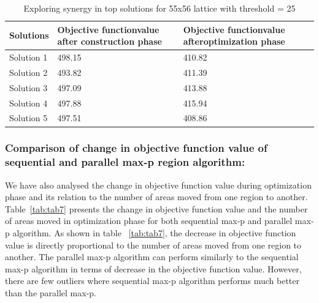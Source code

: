 \documentclass[conference]{IEEEtran}
\begin{document}
\begin{table}[!htbp]
\begin{center}
\begin{tabular}{|C{1.4cm}|C{1.4cm}|C{1.4cm}|}
\hline
Solutions & Objective function\newline value after \newline construction phase & Objective function\newline value after\newline optimization phase\\
\hline
Solution 1 & 498.15 & 410.82\\
\hline
Solution 2 & 493.82 & 411.39\\
\hline
Solution 3 & 497.09 & 413.88\\
\hline
Solution 4 & 497.88 & 415.94\\
\hline
Solution 5 & 497.51 & 408.86\\
\hline
\end{tabular}
\caption{Exploring synergy in top solutions for 55x56 lattice with threshold = 25}
\label{tab:tab10}
\end{center}
\end{table}

\subsubsection*{Comparison of change in objective function value of sequential and parallel max-p region algorithm:}
We have also analysed the change in objective function value during optimization
phase and its relation to the number of areas moved from one region to another.
Table~\ref{tab:tab7} presents the change in objective function value and the number
of areas moved in optimization phase for both sequential max-p and parallel
max-p algorithm. As shown in table ~\ref{tab:tab7}, the decrease in objective
function value is directly proportional to the number of areas moved from one
region to another. The parallel max-p algorithm can perform similarly to
the sequential max-p algorithm in terms of decrease in the objective function
value. However, there are few outliers where sequential max-p algorithm performs
much better than the parallel max-p.
\end{document}
